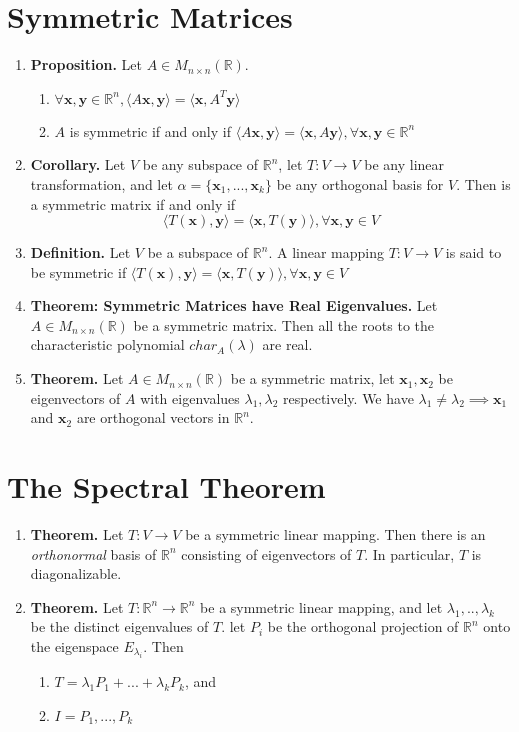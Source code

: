 \documentclass[oneside, 12pt]{book}
\newcommand{\settag}[1]{\renewcommand{\theenumi}{#1}}
\newcommand{\R}{\mathbb{R}}
\newcommand{\tbf}[1]{\textbf{#1}}
\newcommand{\trans}[3]{$#1:#2\rightarrow{}#3$}
\newcommand{\map}[3]{\text{$\left[#1\right]_{#2}^{#3}$}}
\newcommand{\mat}[2]{M_{#1 \times #2}(\R)}
\newcommand{\para}[1]{\item \tbf{#1}}
\newcommand{\vx}{\mathbf{x}}
\newcommand{\vy}{\mathbf{y}}
\begin{document}
\section{Symmetric Matrices}
\begin{enumerate}
    \settag{4.5.2a}
    \para{Proposition.} Let $A \in \mat{n}{n}$.
    \begin{enumerate}
        \item $\forall \vx,\vy \in \R^n, \langle A\vx,\vy\rangle = \langle \vx, A^T\vy\rangle$
        \item $A$ is symmetric if and only if $\langle A\vx,\vy\rangle = \langle \vx,A\vy 
        \rangle, \forall \vx, \vy \in \R^n$
    \end{enumerate}
    
    \settag{4.5.2b}
    \para{Corollary.} Let $V$ be any subspace of $\R^n$, let \trans{T}{V}{V} be any linear 
    transformation, and let $\alpha = \{\vx_1,...,\vx_k\}$ be any orthogonal basis for $V$. 
    Then \map{T}{\alpha}{\alpha} is a symmetric matrix if and only if $$\langle T(\vx), 
    \vy\rangle = \langle \vx,T(\vy)\rangle, \forall \vx, \vy \in V$$
    
    \settag{4.5.3}
    \para{Definition.} Let $V$ be a subspace of $\R^n$. A linear mapping \trans{T}{V}{V} 
    is said to be symmetric if $\langle T(\vx),\vy\rangle = \langle \vx, T(\vy) \rangle, \forall \vx, \vy \in V$
    
    \settag{4.5.6}
    \para{Theorem: Symmetric Matrices have Real Eigenvalues.} Let $A \in \mat{n}{n}$ be a 
    symmetric matrix. Then all the roots to the characteristic polynomial $char_A(\lambda)$ are real.
    
    \settag{4.5.7}
    \para{Theorem.} Let $A \in \mat{n}{n}$ be a symmetric matrix, let $\vx_1, \vx_2$ be 
    eigenvectors of $A$ with eigenvalues $\lambda_1, \lambda_2$ respectively. We have 
    $\lambda_1 \neq \lambda_2 \implies \vx_1$ and $\vx_2$ are orthogonal vectors in $\R^n$.
\end{enumerate}

\section{The Spectral Theorem}
\begin{enumerate}
    \settag{4.6.1}
    \para{Theorem.} Let \trans{T}{V}{V} be a symmetric linear mapping. Then there is 
    an \textit{orthonormal} basis of $\R^n$ consisting of eigenvectors of $T$. In particular, 
    $T$ is diagonalizable.
    
    \settag{4.6.3}
    \para{Theorem.} Let \trans{T}{\R^n}{\R^n} be a symmetric linear mapping, and let 
    $\lambda_1,..,\lambda_k$ be the distinct eigenvalues of $T$. let $P_i$ be the 
    orthogonal projection of $\R^n$ onto the eigenspace $E_{\lambda_i}$. Then
    \begin{enumerate}
        \item $T = \lambda_1P_1+...+\lambda_k P_k$, and
        \item $I = P_1,...,P_k$
    \end{enumerate}
\end{enumerate}
\end{document}
